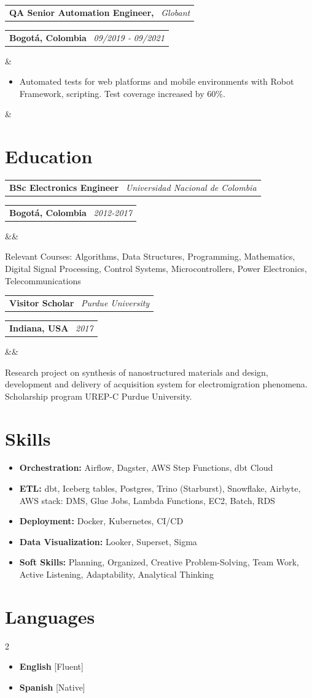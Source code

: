 \documentclass[11pt,a4paper,sans]{moderncv}
\makeatletter
\newcommand*{\customcventry}[7][.13em]{
\begin{tabular}{@{}l}
{\bfseries #4} \
{\itshape #3}
\end{tabular}
\hfill
\begin{tabular}{l@{}}
{\bfseries #5} \
{\itshape #2}
\end{tabular}
\ifx&#7&%
\else{\
\begin{minipage}{\maincolumnwidth}%
\small#7%
\end{minipage}}\fi%
\par\addvspace{#1}}
\makeatother
\begin{document}
\customcventry{09/2019 ‐ 09/2021}{{Globant}}{QA Senior Automation Engineer, }{Bogotá, Colombia}{}{
{\begin{itemize}[leftmargin=0.6cm, label={\textbullet}, itemsep=0em]
\item Automated tests for web platforms and mobile environments with Robot Framework, scripting. Test coverage increased by 60\%.
\end{itemize}}}

\section{Education}
\customcventry{2012-2017}{Universidad Nacional de Colombia}{BSc Electronics Engineer}{Bogotá, Colombia}{}{}
{Relevant Courses: Algorithms, Data Structures, Programming, Mathematics, Digital Signal Processing, Control Systems, Microcontrollers, Power Electronics, Telecommunications}

\customcventry{2017}{Purdue University}{Visitor Scholar}{Indiana, USA}{}{}
{Research project on synthesis of nanostructured materials and design, development and delivery of acquisition system for electromigration phenomena. Scholarship program UREP-C Purdue University.}

\section{Skills}
{\begin{itemize}[label=\textbullet]
\setlength\itemsep{-0.2cm}
\item {\textbf{Orchestration:} Airflow, Dagster, AWS Step Functions, dbt Cloud}
\item {\textbf{ETL:} dbt, Iceberg tables, Postgres, Trino (Starburst), Snowflake, Airbyte, AWS stack: DMS, Glue Jobs, Lambda Functions, EC2, Batch, RDS}
\item {\textbf{Deployment:} Docker, Kubernetes, CI/CD}
\item {\textbf{Data Visualization:} Looker, Superset, Sigma }
\item {\textbf{Soft Skills:} Planning, Organized, Creative Problem-Solving, Team Work, Active Listening, Adaptability, Analytical Thinking}
\end{itemize}}
\vspace*{-8mm}
\section{Languages}
\begin{multicols}{2}
    \begin{itemize}[leftmargin=0.6cm, label=\textbullet, noitemsep]
    \item \textbf{English} [Fluent]
    \item {\textbf{Spanish} [Native]}
    \end{itemize}
\end{multicols}
\end{document}
